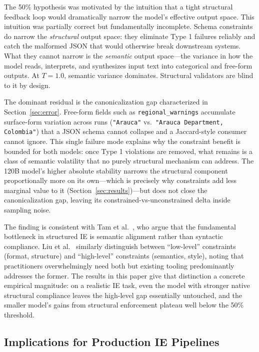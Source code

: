 \documentclass[sigconf]{acmart}
\begin{document}
The 50\% hypothesis was motivated by the intuition that a tight structural feedback loop would dramatically narrow the model's effective output space. This intuition was partially correct but fundamentally incomplete. Schema constraints do narrow the \emph{structural} output space: they eliminate Type 1 failures reliably and catch the malformed JSON that would otherwise break downstream systems. What they cannot narrow is the \emph{semantic} output space---the variance in how the model reads, interprets, and synthesizes input text into categorical and free-form outputs. At $T{=}1.0$, semantic variance dominates. Structural validators are blind to it by design.

The dominant residual is the canonicalization gap characterized in Section~\ref{sec:error}. Free-form fields such as \texttt{regional\_warnings} accumulate surface-form variation across runs (\texttt{"Arauca"} vs.\ \texttt{"Arauca Department, Colombia"}) that a JSON schema cannot collapse and a Jaccard-style consumer cannot ignore. This single failure mode explains why the constraint benefit is bounded for both models: once Type 1 violations are removed, what remains is a class of semantic volatility that no purely structural mechanism can address. The 120B model's higher absolute stability narrows the structural component proportionally more on its own---which is precisely why constraints add less marginal value to it (Section~\ref{sec:results})---but does not close the canonicalization gap, leaving its constrained-vs-unconstrained delta inside sampling noise.

The finding is consistent with Tam et al.\ \cite{tam2024let}, who argue that the fundamental bottleneck in structured IE is semantic alignment rather than syntactic compliance. Liu et al.\ \cite{liu2024we} similarly distinguish between ``low-level'' constraints (format, structure) and ``high-level'' constraints (semantics, style), noting that practitioners overwhelmingly need both but existing tooling predominantly addresses the former. The results in this paper give that distinction a concrete empirical magnitude: on a realistic IE task, even the model with stronger native structural compliance leaves the high-level gap essentially untouched, and the smaller model's gains from structural enforcement plateau well below the 50\% threshold.

\subsection{Implications for Production IE Pipelines}
\end{document}
